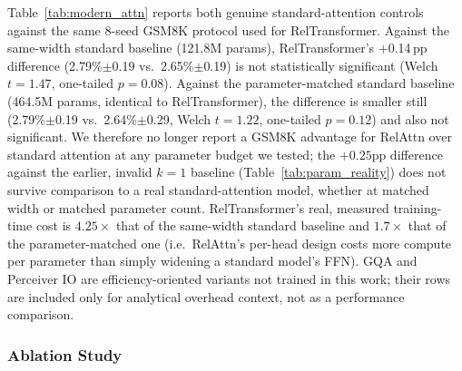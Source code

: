 \documentclass[review]{elsarticle}
\begin{document}
Table~\ref{tab:modern_attn} reports both genuine standard-attention controls against the same 8-seed GSM8K protocol used for RelTransformer. Against the same-width standard baseline (121.8M params), RelTransformer's $+$0.14\,pp difference (2.79\%$\pm$0.19 vs.\ 2.65\%$\pm$0.19) is not statistically significant (Welch $t{=}1.47$, one-tailed $p{=}0.08$). Against the parameter-matched standard baseline (464.5M params, identical to RelTransformer), the difference is smaller still (2.79\%$\pm$0.19 vs.\ 2.64\%$\pm$0.29, Welch $t{=}1.22$, one-tailed $p{=}0.12$) and also not significant. We therefore no longer report a GSM8K advantage for RelAttn over standard attention at any parameter budget we tested; the $+0.25$pp difference against the earlier, invalid $k{=}1$ baseline (Table~\ref{tab:param_reality}) does not survive comparison to a real standard-attention model, whether at matched width or matched parameter count. RelTransformer's real, measured training-time cost is $4.25\times$ that of the same-width standard baseline and $1.7\times$ that of the parameter-matched one (i.e.\ RelAttn's per-head design costs more compute per parameter than simply widening a standard model's FFN). GQA and Perceiver IO are efficiency-oriented variants not trained in this work; their rows are included only for analytical overhead context, not as a performance comparison.

\subsubsection{Ablation Study}

\begin{table}[t]
\centering
\caption{Component ablation ($d{=}512$, 12~enc/dec layers), all measured on GSM8K. $^v$Measured, $n{=}8$ seeds for the two headline rows (Full RelTransformer, Standard Transformer), $n{=}3$ for all other rows (component and pairing ablations were not extended to $n{=}8$; treat their comparisons to the headline rows as suggestive, not power-matched).}
\label{tab:ablation}
\end{table}
\end{document}
